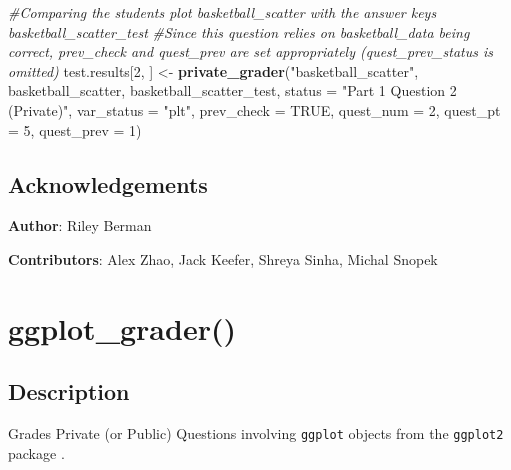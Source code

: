 \documentclass[
  12pt,
]{book}
\newenvironment{Shaded}{\begin{snugshade}}{\end{snugshade}}
\newcommand{\AttributeTok}[1]{\textcolor[rgb]{0.13,0.29,0.53}{#1}}
\newcommand{\CommentTok}[1]{\textcolor[rgb]{0.56,0.35,0.01}{\textit{#1}}}
\newcommand{\ConstantTok}[1]{\textcolor[rgb]{0.56,0.35,0.01}{#1}}
\newcommand{\DecValTok}[1]{\textcolor[rgb]{0.00,0.00,0.81}{#1}}
\newcommand{\FunctionTok}[1]{\textcolor[rgb]{0.13,0.29,0.53}{\textbf{#1}}}
\newcommand{\NormalTok}[1]{#1}
\newcommand{\OtherTok}[1]{\textcolor[rgb]{0.56,0.35,0.01}{#1}}
\newcommand{\StringTok}[1]{\textcolor[rgb]{0.31,0.60,0.02}{#1}}
\begin{document}
\begin{Shaded}
\begin{Highlighting}[]
\CommentTok{\#Comparing the student\textquotesingle{}s plot \textasciigrave{}basketball\_scatter\textasciigrave{} with the answer key\textquotesingle{}s \textasciigrave{}basketball\_scatter\_test\textasciigrave{} }
\CommentTok{\#Since this question relies on \textasciigrave{}basketball\_data\textasciigrave{} being correct, \textasciigrave{}prev\_check\textasciigrave{} and \textasciigrave{}quest\_prev\textasciigrave{} are set appropriately (\textasciigrave{}quest\_prev\_status\textasciigrave{} is omitted)}
\NormalTok{test.results[}\DecValTok{2}\NormalTok{, ] }\OtherTok{\textless{}{-}} \FunctionTok{private\_grader}\NormalTok{(}\StringTok{"basketball\_scatter"}\NormalTok{, basketball\_scatter, basketball\_scatter\_test,}
                                    \AttributeTok{status =} \StringTok{"Part 1 Question 2 (Private)"}\NormalTok{, }\AttributeTok{var\_status =} \StringTok{"plt"}\NormalTok{,}
                                    \AttributeTok{prev\_check =} \ConstantTok{TRUE}\NormalTok{, }\AttributeTok{quest\_num =} \DecValTok{2}\NormalTok{, }\AttributeTok{quest\_pt =} \DecValTok{5}\NormalTok{, }\AttributeTok{quest\_prev =} \DecValTok{1}\NormalTok{)}
\end{Highlighting}
\end{Shaded}

\subsection*{Acknowledgements}\label{acknowledgements}

\textbf{Author}: Riley Berman

\textbf{Contributors}: Alex Zhao, Jack Keefer, Shreya Sinha, Michal Snopek

\section{ggplot\_grader()}\label{ggplot_grader}

\subsection*{Description}\label{description-1}

Grades Private (or Public) Questions involving \texttt{ggplot} objects from the \texttt{ggplot2} package \citep{R-ggplot2}.
\end{document}
